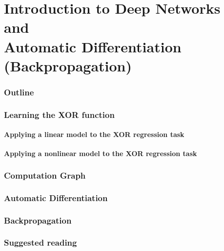 \renewcommand{\thispart}{3}
\renewcommand{\thispartname}{
  Introduction to Deep Networks and\\
  Automatic Differentiation (Backpropagation)
}

\part{\thispartname}



\section{Outline}


\section{Learning the XOR function}

\subsection{Applying a linear model to the XOR regression task}

\subsection{Applying a nonlinear model to the XOR regression task}


\section{Computation Graph}



\section{Automatic Differentiation}







\section{Backpropagation}

\section{Suggested reading}


